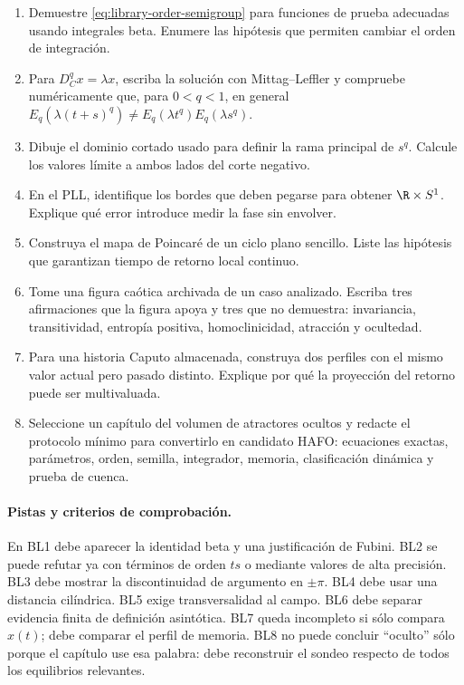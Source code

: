 \begin{enumerate}[label=\textbf{BL\arabic*.}]
 \item Demuestre \eqref{eq:library-order-semigroup} para funciones de prueba
 adecuadas usando integrales beta. Enumere las hipótesis que permiten cambiar
 el orden de integración.
 \item Para \(D_C^q x=\lambda x\), escriba la solución con
 Mittag--Leffler y compruebe numéricamente que, para \(0<q<1\), en general
 \(E_q(\lambda(t+s)^q)\ne E_q(\lambda t^q)E_q(\lambda s^q)\).
 \item Dibuje el dominio cortado usado para definir la rama principal de
 \(s^q\). Calcule los valores límite a ambos lados del corte negativo.
 \item En el PLL, identifique los bordes que deben pegarse para obtener
 \(\R\times S^1\). Explique qué error introduce medir la fase sin envolver.
 \item Construya el mapa de Poincaré de un ciclo plano sencillo. Liste las
 hipótesis que garantizan tiempo de retorno local continuo.
 \item Tome una figura caótica archivada de un caso analizado. Escriba tres afirmaciones que la
 figura apoya y tres que no demuestra: invariancia, transitividad, entropía
 positiva, homoclinicidad, atracción y ocultedad.
 \item Para una historia Caputo almacenada, construya dos perfiles con el mismo
 valor actual pero pasado distinto. Explique por qué la proyección del retorno
 puede ser multivaluada.
 \item Seleccione un capítulo del volumen de atractores ocultos y redacte el
 protocolo mínimo para convertirlo en candidato HAFO: ecuaciones exactas,
 parámetros, orden, semilla, integrador, memoria, clasificación dinámica y
 prueba de cuenca.
\end{enumerate}

\paragraph{Pistas y criterios de comprobación.}
En BL1 debe aparecer la identidad beta y una justificación de Fubini. BL2 se
puede refutar ya con términos de orden \(ts\) o mediante valores de alta
precisión. BL3 debe mostrar la discontinuidad de argumento en \(\pm\pi\). BL4
debe usar una distancia cilíndrica. BL5 exige transversalidad al campo. BL6
debe separar evidencia finita de definición asintótica. BL7 queda incompleto
si sólo compara \(x(t)\); debe comparar el perfil de memoria. BL8 no puede
concluir ``oculto'' sólo porque el capítulo use esa palabra: debe reconstruir
el sondeo respecto de todos los equilibrios relevantes.
